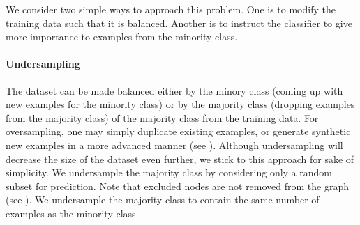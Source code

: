 \documentclass[
	fontsize=10pt, %
	twoside=false, %
	secnumdepth=1, %
  toc=indentunnumbered %
]{kaobook}
\begin{document}
We consider two simple ways to approach this problem. One is to modify the
training data such that it is balanced. Another is to instruct the classifier to
give more importance to examples from the minority class.



\paragraph{Undersampling}
The dataset can be made balanced 
either by  the minory class (coming up with new examples for
the minority class) or by  the majority class (dropping
examples from the majority class) of the majority class from the training data.
For oversampling, one may simply duplicate existing examples, or generate
synthetic new examples in a more advanced manner (see
). Although undersampling will decrease the size of the
dataset even further, we stick to this approach for sake of simplicity.
%
We undersample the majority class by considering only a random subset for
prediction. Note that excluded nodes are not removed from the graph (see
). We undersample the majority class to contain
the same number of examples as the minority class.


\end{document}
